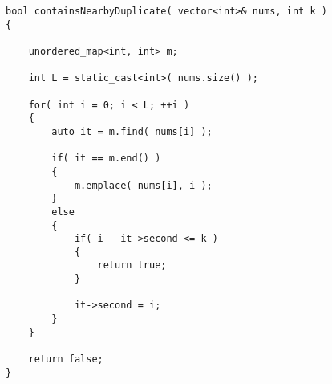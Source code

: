 \setcounter{lstlisting}{0}

\begin{lstlisting}[style=customc, caption={Hash Table}]
bool containsNearbyDuplicate( vector<int>& nums, int k )
{

    unordered_map<int, int> m;

    int L = static_cast<int>( nums.size() );

    for( int i = 0; i < L; ++i )
    {
        auto it = m.find( nums[i] );

        if( it == m.end() )
        {
            m.emplace( nums[i], i );
        }
        else
        {
            if( i - it->second <= k )
            {
                return true;
            }

            it->second = i;
        }
    }

    return false;
}

\end{lstlisting}
